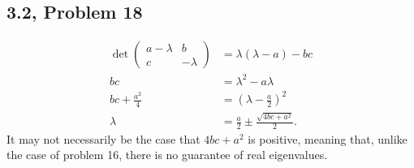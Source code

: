 \documentclass[10pt]{mypackage}
\begin{document}
\subsection{3.2, Problem 18}%
\begin{align*}
  \det \begin{pmatrix}a - \lambda & b \\ c & -\lambda\end{pmatrix} &= \lambda\left(\lambda - a\right) - bc\\
  bc &= \lambda^2 - a\lambda\\
  bc + \frac{a^2}{4} &= \left(\lambda - \frac{a}{2}\right)^2\\
  \lambda &= \frac{a}{2} \pm \frac{\sqrt{4bc + a^2}}{2}.
\end{align*}
It may not necessarily be the case that $4bc + a^2$ is positive, meaning that, unlike the case of problem 16, there is no guarantee of real eigenvalues.
\end{document}

